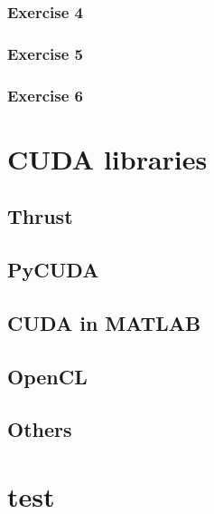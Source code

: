 \documentclass[12px,oz]{report}
\theoremstyle{indented}
\theoremstyle{indented}
\begin{document}
		\subsection{Exercise 4}
		
		
		\subsection{Exercise 5}
		
		\subsection{Exercise 6}
	
\chapter{CUDA libraries}
\label{ch-libraries}


	\section{Thrust}
	\label{sec-thrust}
	
	
	\section{PyCUDA}
	\label{sec-pycuda}
	
	
	\section{CUDA in MATLAB}
	\label{sec-matlab}
	
	
	\section{OpenCL}
	\label{sec-opencl}
	
	
	\section{Others}
	\label{sec-others}
	

\cite{McCool2012}
\cite{udacity:parallel}




\appendix
\chapter{test}
\end{document}
